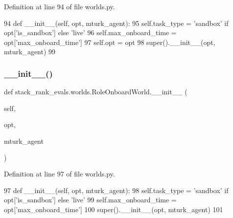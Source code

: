 Definition at line 94 of file worlds.\+py.


\begin{DoxyCode}
94     \textcolor{keyword}{def }\_\_init\_\_(self, opt, mturk\_agent):
95         self.task\_type = \textcolor{stringliteral}{'sandbox'} \textcolor{keywordflow}{if} opt[\textcolor{stringliteral}{'is\_sandbox'}] \textcolor{keywordflow}{else} \textcolor{stringliteral}{'live'}
96         self.max\_onboard\_time = opt[\textcolor{stringliteral}{'max\_onboard\_time'}]
97         self.opt = opt
98         super().\_\_init\_\_(opt, mturk\_agent)
99 
\end{DoxyCode}
\mbox{\label{classstack__rank__evals_1_1worlds_1_1RoleOnboardWorld_a93c85daae3056c33bc77b6159ce43b57}} 
\subsubsection{\texorpdfstring{\+\_\+\+\_\+init\+\_\+\+\_\+()}{\_\_init\_\_()}\hspace{0.1cm}{\footnotesize\ttfamily [2/2]}}
{\footnotesize\ttfamily def stack\+\_\+rank\+\_\+evals.\+worlds.\+Role\+Onboard\+World.\+\_\+\+\_\+init\+\_\+\+\_\+ (\begin{DoxyParamCaption}\item[{}]{self,  }\item[{}]{opt,  }\item[{}]{mturk\+\_\+agent }\end{DoxyParamCaption})}



Definition at line 97 of file worlds.\+py.


\begin{DoxyCode}
97     \textcolor{keyword}{def }\_\_init\_\_(self, opt, mturk\_agent):
98         self.task\_type = \textcolor{stringliteral}{'sandbox'} \textcolor{keywordflow}{if} opt[\textcolor{stringliteral}{'is\_sandbox'}] \textcolor{keywordflow}{else} \textcolor{stringliteral}{'live'}
99         self.max\_onboard\_time = opt[\textcolor{stringliteral}{'max\_onboard\_time'}]
100         super().\_\_init\_\_(opt, mturk\_agent)
101 
\end{DoxyCode}



